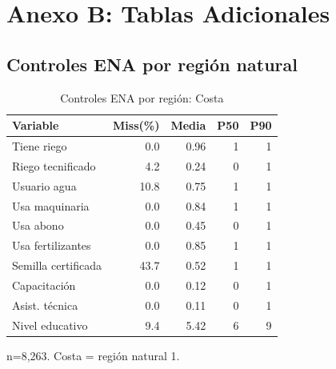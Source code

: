 \documentclass[11pt,a4paper]{article}
\begin{document}
\section{Anexo B: Tablas Adicionales}

\subsection{Controles ENA por región natural}

\begin{table}[H]
\centering
\caption{Controles ENA por región: Costa}
\label{tab:ena_controls_costa}
\begin{threeparttable}
\small
\begin{tabular}{lrrrr}
\toprule
\textbf{Variable} & \textbf{Miss(\%)} & \textbf{Media} & \textbf{P50} & \textbf{P90} \\
\midrule
Tiene riego & 0.0 & 0.96 & 1 & 1 \\
Riego tecnificado & 4.2 & 0.24 & 0 & 1 \\
Usuario agua & 10.8 & 0.75 & 1 & 1 \\
Usa maquinaria & 0.0 & 0.84 & 1 & 1 \\
Usa abono & 0.0 & 0.45 & 0 & 1 \\
Usa fertilizantes & 0.0 & 0.85 & 1 & 1 \\
Semilla certificada & 43.7 & 0.52 & 1 & 1 \\
Capacitación & 0.0 & 0.12 & 0 & 1 \\
Asist. técnica & 0.0 & 0.11 & 0 & 1 \\
Nivel educativo & 9.4 & 5.42 & 6 & 9 \\
\bottomrule
\end{tabular}
\begin{tablenotes}
\footnotesize
\item n=8,263. Costa = región natural 1.
\end{tablenotes}
\end{threeparttable}
\end{table}
\end{document}
